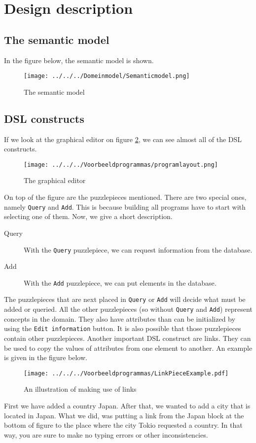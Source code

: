 \section{Design description}
\subsection{The semantic model}
In the figure below, the semantic model is shown.
\begin{figure}[H]
	\centering
	\texttt{[image: ../../../Domeinmodel/Semanticmodel.png]}
	\caption{The semantic model}
	\label{Semanticmodel}
\end{figure}
\subsection{DSL constructs}
If we look at the graphical editor on figure \ref{fig:DSLlayoutinconstructs}, we can see almost all of the DSL constructs.
\begin{figure}[H]
	\centering
	\texttt{[image: ../../../Voorbeeldprogrammas/programlayout.png]}
	\caption{The graphical editor}
	\label{fig:DSLlayoutinconstructs}
\end{figure}
\noindent On top of the figure are the puzzlepieces mentioned. There are two special ones, namely \texttt{Query} and \texttt{Add}. This is because building all programs have to start with selecting one of them.  Now, we give a short description.
\begin{description}
 \item[Query] With the \texttt{Query} puzzlepiece, we can request information from the database.
 \item[Add] With the \texttt{Add} puzzlepiece, we can put elements in the database.  
\end{description}
The puzzlepieces that are next placed in \texttt{Query} or \texttt{Add} will decide what must be added or queried.
All the other puzzlepieces (so without \texttt{Query} and \texttt{Add}) represent concepts in the domain. They also have attributes than can be initialized by using the \texttt{Edit information} button. It is also possible that those puzzlepieces contain other puzzlepieces. 
Another important DSL construct are links. They can be used to copy the values of attributes from one element to another. An example is given in the figure below.
\begin{figure}[H]
	\centering
	\texttt{[image: ../../../Voorbeeldprogrammas/LinkPieceExample.pdf]}
	\caption{An illustration of making use of links}
	\label{linkpieceexample}
\end{figure}
First we have added a country Japan. After that, we wanted to add a city that is located in Japan. What we did, was putting a link from the Japan block at the bottom of figure to the place where the city Tokio requested a country. In that way, you are sure to make no typing errors or other inconsistencies.

